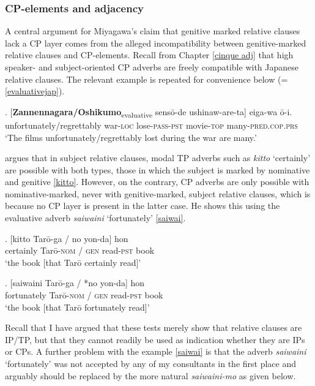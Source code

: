 \documentclass [output=book,colorlinks,citecolor=brown]{langscibook}
\begin{document}
\subsubsection{CP-elements and adjacency}

A central argument for Miyagawa's claim that genitive marked relative clauses lack a CP layer comes from the alleged incompatibility between genitive-marked relative clauses and CP-elements. Recall from Chapter \ref{cinque adj} that high speaker- and subject-oriented CP adverbs are freely compatible with Japanese relative clauses. The relevant example is repeated for convenience below (= \ref{evaluativejap}). %

\exg. [\textbf{Zannennagara/Oshikumo}\textsubscript{evaluative} sensō-de ushinaw-are-ta] eiga-wa ō-i.\\
unfortunately/regrettably war-\textsc{loc} lose-\textsc{pass-pst} movie-\textsc{top} many-\textsc{pred.cop.prs}\\
`The films unfortunately/regrettably lost during the war are many.’

\citet[1273]{miyagawa:2011:genitive} argues that in subject relative clauses, modal TP adverbs such as \textit{kitto} `certainly' are possible with both types, those in which the subject is marked by nominative and genitive \ref{kitto}. However, on the contrary, CP adverbs are only possible with nominative-marked, never with genitive-marked, subject relative clauses, which is because no CP layer is present in the latter case. He shows this using the evaluative adverb \textit{saiwaini} `fortunately' \ref{saiwai}. %

\exg. [kitto Tarō-ga / no yon-da] hon\\
certainly Tarō-\textsc{nom} / \textsc{gen} read-\textsc{pst} book\\
`the book [that Tarō certainly read]’ \null \hfill \citep[1273]{miyagawa:2011:genitive} \label{kitto}

\exg. [saiwaini Tarō-ga / *no yon-da] hon\\
fortunately Tarō-\textsc{nom} / \textsc{gen} read-\textsc{pst} book\\
`the book [that Tarō fortunately read]’ \null \hfill \citep[1273]{miyagawa:2011:genitive} \label{saiwai}

Recall that I have argued that these tests merely show that relative clauses are IP/TP, but that they cannot readily be used as indication whether they are IPs or CPs. A further problem with the example \ref{saiwai} is that the adverb \textit{saiwaini} `fortunately' was not accepted by any of my consultants in the first place and arguably should be replaced by the more natural \textit{saiwaini-mo} as given below. %
\end{document}
